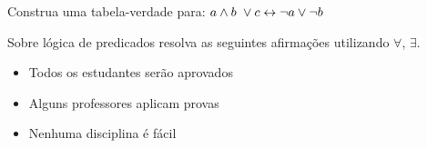 \documentclass[12pt]{exam}
\begin{document}
\begin{questions}
\question Construa uma tabela-verdade para: $a \land b \hspace{3px} \lor  c \leftrightarrow \neg a \lor \neg b$
\begin{solutionbox}{2in} 		
	\end{solutionbox}
\question Sobre lógica de predicados resolva as seguintes afirmações utilizando $\forall$, $\exists$. 
\begin{itemize}
\item Todos os estudantes serão aprovados
\item Alguns professores aplicam provas
\item Nenhuma disciplina é fácil
\end{itemize}
\begin{solutionbox}{2in} 		
	\end{solutionbox}



\end{questions}
\end{document}
